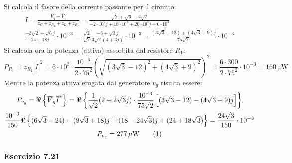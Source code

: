 \documentclass{article}
\newcommand{\tageq}{\tag{\stepcounter{equation}\theequation}}
\newcommand{\SI}[1]{\,\mathrm{#1}}
\begin{document}
Si calcola il fasore della corrente passante per il circuito:
\begin{gather*}
    \overline{I}=\displaystyle\frac{\overline{V}_g-\overline{V}_1}{z_C+z_{R_2}+z_L+z_{R_1}}=\frac{\sqrt{2}+\sqrt{6}-4\sqrt{2}}{-2\cdot10^{3}j+18\cdot10^3+20\cdot10^{3}j+6\cdot10^3}\\
    \displaystyle\frac{-3\sqrt{2}+\sqrt{6}j}{24+18j}\cdot10^{-3}=\frac{\sqrt2}{\sqrt{2}}\frac{-3+\sqrt{3}j}{3\sqrt{2}(4+3j)}\cdot10^{-3}=\frac{(3\sqrt{3}-12)+(4\sqrt{3}+9)j}{75\sqrt{2}}\cdot10^{-3}
\end{gather*}
Si calcola ora la potenza (attiva) assorbita dal resistore $R_1$:
\begin{equation}
    P_{R_1}=z_{R_1}|\overline{I}|^2=6\cdot10^3\cdot\displaystyle\frac{10^{-6}}{2\cdot75^2}\left(\sqrt{(3\sqrt{3}-12)^2+(4\sqrt{3}+9)^2}\right)^2=\frac{6\cdot300}{2\cdot75^2}\cdot10^{-3}=160\SI{\mu W}
\end{equation}
Mentre la potenza attiva erogata dal generatore $v_g$ risulta essere:
\begin{gather*}
    P_{v_g}=\Re\left\{\overline{V}_g\overline{I}^*\right\}=\displaystyle\Re\left\{\frac{1}{\sqrt2}(2+2\sqrt{3}j)\cdot\frac{10^{-3}}{75\sqrt2}\left[(3\sqrt3-12)-(4\sqrt3+9)j\right]\right\}\\
    \displaystyle\frac{10^{-3}}{150}\Re\left\{(6\sqrt3-24)-(8\sqrt3+18)j+(18-24\sqrt3)j+(24+18\sqrt3)\right\}=\frac{24\sqrt3}{150}\cdot10^{-3}\\
    P_{v_g}=277\SI{\mu W}\tageq
\end{gather*}

\subsubsection*{Esercizio 7.21}
\end{document}
